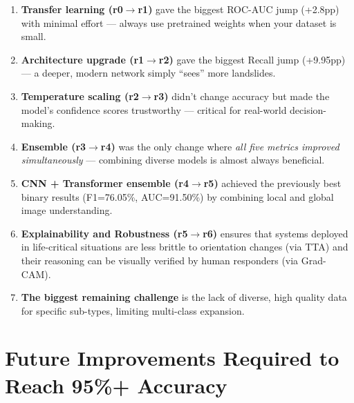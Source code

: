 \documentclass[11pt]{article}
\begin{document}
\begin{enumerate}
    \item \textbf{Transfer learning (r0$\to$r1)} gave the biggest ROC-AUC jump (+2.8pp) with minimal effort --- always use pretrained weights when your dataset is small.

    \item \textbf{Architecture upgrade (r1$\to$r2)} gave the biggest Recall jump (+9.95pp) --- a deeper, modern network simply ``sees'' more landslides.

    \item \textbf{Temperature scaling (r2$\to$r3)} didn't change accuracy but made the model's confidence scores trustworthy --- critical for real-world decision-making.

    \item \textbf{Ensemble (r3$\to$r4)} was the only change where \emph{all five metrics improved simultaneously} --- combining diverse models is almost always beneficial.

    \item \textbf{CNN + Transformer ensemble (r4$\to$r5)} achieved the previously best binary results (F1=76.05\%, AUC=91.50\%) by combining local and global image understanding.

    \item \textbf{Explainability and Robustness (r5$\to$r6)} ensures that systems deployed in life-critical situations are less brittle to orientation changes (via TTA) and their reasoning can be visually verified by human responders (via Grad-CAM).

    \item \textbf{The biggest remaining challenge} is the lack of diverse, high quality data for specific sub-types, limiting multi-class expansion.
\end{enumerate}

\section{Future Improvements Required to Reach 95\%+ Accuracy}
\end{document}
